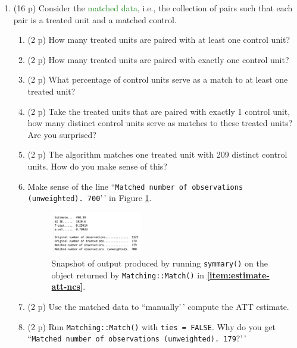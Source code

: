 \documentclass[
]{article}
\providecommand{\tightlist}{%
  \setlength{\itemsep}{0pt}\setlength{\parskip}{0pt}}
\begin{document}
\begin{enumerate}
\def\labelenumi{\arabic{enumi}.}
\setcounter{enumi}{6}
\item
  (16 p) Consider the \textcolor{ForestGreen}{matched data}, i.e., the
  collection of pairs such that each pair is a treated unit and a
  matched control.

  \begin{enumerate}
  \def\labelenumii{\alph{enumii}.}
  \tightlist
  \item
    (2 p) How many treated units are paired with at least one control
    unit?
  \item
    (2 p) How many treated units are paired with exactly one control
    unit?
  \item
    (2 p) What percentage of control units serve as a match to at least
    one treated unit?
  \item
    (2 p) Take the treated units that are paired with exactly 1 control
    unit, how many distinct control units serve as matches to these
    treated units? Are you surprised?
  \item
    (2 p) The algorithm matches one treated unit with 209 distinct
    control units. How do you make sense of this?
  \item
    Make sense of the line
    ``\texttt{Matched number of observations (unweighted). 700}'\,' in
    Figure \ref{fig:nnm_output}.

    \begin{figure}[h]
     \centering
     \captionsetup{width=.6\textwidth}
     \includegraphics[width=0.4\textwidth]{figures/q7_f.png}
     \caption{Snapshot of output produced by running \texttt{symmary()} on the object returned by \texttt{Matching::Match()} in \textbf{\ref{item:estimate-att-ncs}}.}
     \label{fig:nnm_output}
     \end{figure}
  \item
    (2 p) Use the matched data to ``manually'\,' compute the ATT
    estimate.
  \item
    (2 p) Run \texttt{Matching::Match()} with \texttt{ties = FALSE}. Why
    do you get
    ``\texttt{Matched number of observations (unweighted). 179}?'\,'
  \end{enumerate}
\end{enumerate}
\end{document}
